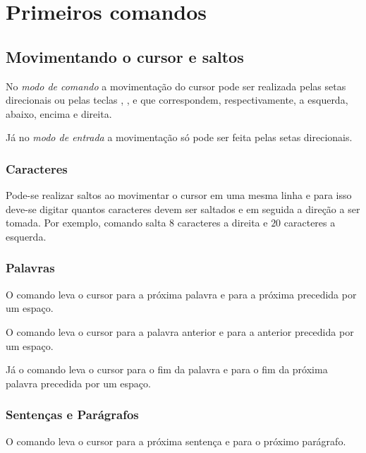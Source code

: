 % 
% 
% 
% 
% 
\chapter{Primeiros comandos} \label{sch:vim:start}
\section{Movimentando o cursor e saltos}
No \textit{modo de comando} a movimentação do cursor pode ser realizada pelas setas direcionais ou pelas teclas , ,  e  que correspondem, respectivamente, a esquerda, abaixo, encima e direita.

Já no \textit{modo de entrada} a movimentação só pode ser feita pelas setas direcionais.

\subsection{Caracteres}
Pode-se realizar saltos ao movimentar o cursor em uma mesma linha e para isso deve-se digitar quantos caracteres devem ser saltados e em seguida a direção a ser tomada. Por exemplo, comando  salta $8$ caracteres a direita e  $20$ caracteres a esquerda.

\subsection{Palavras}
O comando  leva o cursor para a próxima palavra e  para a próxima precedida por um espaço.

O comando  leva o cursor para a palavra anterior e  para a anterior precedida por um espaço.

Já o comando  leva o cursor para o fim da palavra e  para o fim da próxima palavra precedida por um espaço.

\subsection{Sentenças e Parágrafos}
O comando \lcode{)} leva o cursor para a próxima sentença e \lcode{\}} para o próximo parágrafo.

